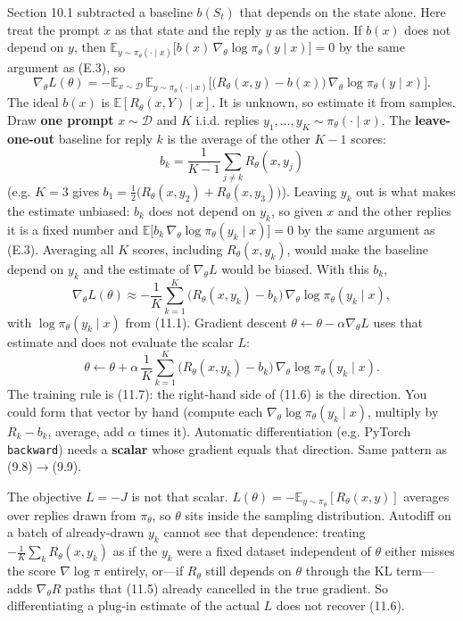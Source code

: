 Section 10.1 subtracted a baseline $b(S_t)$ that depends on the state alone. Here treat the prompt $x$ as that state and the reply $y$ as the action. If $b(x)$ does not depend on $y$, then $\mathbb{E}_{y\sim\pi_\theta(\cdot\mid x)}\bigl[b(x)\,\nabla_\theta\log\pi_\theta(y\mid x)\bigr]=0$ by the same argument as (E.3), so \[
\nabla_\theta L(\theta)
=
-
\mathbb{E}_{x\sim\mathcal{D}}\,
\mathbb{E}_{y\sim\pi_\theta(\cdot\mid x)}
\bigl[
\bigl(R_\theta(x,y)-b(x)\bigr)\,
\nabla_\theta\log\pi_\theta(y\mid x)
\bigr].
\] The ideal $b(x)$ is $\mathbb{E}[R_\theta(x,Y)\mid x]$. It is unknown, so estimate it from samples. Draw \textbf{one prompt} $x\sim\mathcal{D}$ and $K$ i.i.d. replies $y_1,\ldots,y_K\sim\pi_\theta(\cdot\mid x)$. The \textbf{leave-one-out} baseline for reply $k$ is the average of the other $K-1$ scores: \[
b_k
=
\frac{1}{K-1}\sum_{j\neq k}R_\theta(x,y_j)
\] (e.g. $K=3$ gives $b_1=\tfrac12\bigl(R_\theta(x,y_2)+R_\theta(x,y_3)\bigr)$). Leaving $y_k$ out is what makes the estimate unbiased: $b_k$ does not depend on $y_k$, so given $x$ and the other replies it is a fixed number and $\mathbb{E}\bigl[b_k\,\nabla_\theta\log\pi_\theta(y_k\mid x)\bigr]=0$ by the same argument as (E.3). Averaging all $K$ scores, including $R_\theta(x,y_k)$, would make the baseline depend on $y_k$ and the estimate of $\nabla_\theta L$ would be biased. With this $b_k$, \begin{equation}
\nabla_\theta L(\theta)
\approx
-\frac{1}{K}\sum_{k=1}^{K}
\bigl(R_\theta(x,y_k)-b_k\bigr)\,
\nabla_\theta\log\pi_\theta(y_k\mid x),
\tag{11.6}
\end{equation} with $\log\pi_\theta(y_k\mid x)$ from (11.1). Gradient descent $\theta\leftarrow\theta-\alpha\nabla_\theta L$ uses that estimate and does not evaluate the scalar $L$: \begin{equation}
\theta
\leftarrow
\theta
+
\alpha\,
\frac{1}{K}\sum_{k=1}^{K}
\bigl(R_\theta(x,y_k)-b_k\bigr)\,
\nabla_\theta\log\pi_\theta(y_k\mid x).
\tag{11.7}
\end{equation} The training rule is (11.7): the right-hand side of (11.6) is the direction. You could form that vector by hand (compute each $\nabla_\theta\log\pi_\theta(y_k\mid x)$, multiply by $R_k-b_k$, average, add $\alpha$ times it). Automatic differentiation (e.g. PyTorch \texttt{backward}) needs a \textbf{scalar} whose gradient equals that direction. Same pattern as (9.8)$\to$(9.9).

The objective $L=-J$ is not that scalar. $L(\theta)=-\mathbb{E}_{y\sim\pi_\theta}[R_\theta(x,y)]$ averages over replies drawn from $\pi_\theta$, so $\theta$ sits inside the sampling distribution. Autodiff on a batch of already-drawn $y_k$ cannot see that dependence: treating $-\frac1K\sum_k R_\theta(x,y_k)$ as if the $y_k$ were a fixed dataset independent of $\theta$ either misses the score $\nabla\log\pi$ entirely, or---if $R_\theta$ still depends on $\theta$ through the KL term---adds $\nabla_\theta R$ paths that (11.5) already cancelled in the true gradient. So differentiating a plug-in estimate of the actual $L$ does not recover (11.6).

